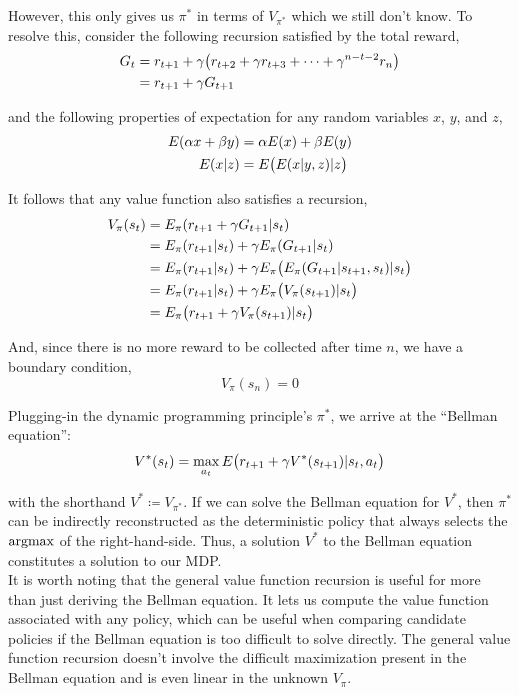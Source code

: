 However, this only gives us $\pi^*$ in terms of $V_{\pi^*}$ which we still don't know. To resolve this, consider the following recursion satisfied by the total reward,
\begin{align*}
G_t &= r_{t+1} + \gamma \big{(}r_{t+2} + \gamma r_{t+3} + \cdots + \gamma^{n-t-2} r_n\big{)}\\
&= r_{t+1} + \gamma G_{t+1}
\end{align*}

and the following properties of expectation for any random variables $x$, $y$, and $z$,
\begin{align*}
E(\alpha x + \beta y) &= \alpha E(x) + \beta E(y)\\
E(x | z) &= E\big{(}E(x | y, z) | z\big{)}
\end{align*}

It follows that any value function also satisfies a recursion,
\begin{align*}
V_\pi(s_t) &= E_\pi(r_{t+1} + \gamma G_{t+1} | s_t)\\
&= E_\pi(r_{t+1}|s_t) + \gamma E_\pi(G_{t+1} | s_t)\\
&= E_\pi(r_{t+1}|s_t) + \gamma E_\pi\big{(}E_\pi(G_{t+1}|s_{t+1},s_t) | s_t\big{)}\\
&= E_\pi(r_{t+1}|s_t) + \gamma E_\pi\big{(}V_{\pi}(s_{t+1}) | s_t\big{)}\\
&= E_\pi\big{(}r_{t+1} + \gamma V_{\pi}(s_{t+1}) | s_t\big{)}
\end{align*}

And, since there is no more reward to be collected after time $n$, we have a boundary condition,
\begin{equation*}
V_{\pi}(s_n) = 0
\end{equation*}

Plugging-in the dynamic programming principle's $\pi^*$, we arrive at the ``Bellman equation'':
\begin{equation*}
V^*(s_t) = \max_{a_t} E\big{(}r_{t+1} + \gamma V^*(s_{t+1}) | s_t, a_t\big{)}
\end{equation*}

with the shorthand $V^* \coloneqq V_{\pi^*}$. If we can solve the Bellman equation for $V^*$, then $\pi^*$ can be indirectly reconstructed as the deterministic policy that always selects the $\operatorname*{argmax}$ of the right-hand-side. Thus, a solution $V^*$ to the Bellman equation constitutes a solution to our MDP.\\

It is worth noting that the general value function recursion is useful for more than just deriving the Bellman equation. It lets us compute the value function associated with any policy, which can be useful when comparing candidate policies if the Bellman equation is too difficult to solve directly. The general value function recursion doesn't involve the difficult maximization present in the Bellman equation and is even linear in the unknown $V_\pi$.\\

